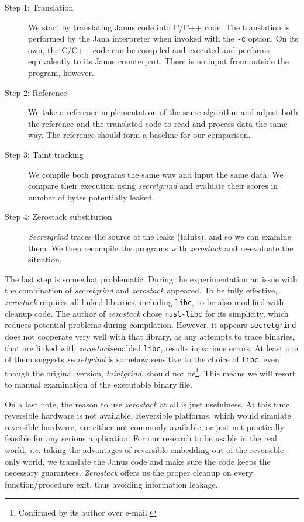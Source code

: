 \documentclass[a4paper,10pt,openright]{memoir}
\newcommand{\ie}{\emph{i.e.}\xspace}
\newcommand{\term}[1]{\textit{#1}}
\newcommand{\code}[1]{\texttt{#1}}
\begin{document}
\begin{description}

\item[Step 1: Translation] We start by translating Janus code into 
C/C++ code. The translation is performed by the Jana interpreter when 
invoked with the \code{-c} option. On its own, the C/C++ code can be 
compiled and executed and performs equivalently to its Janus 
counterpart. There is no input from outside the program, however.

\item[Step 2: Reference] We take a reference implementation of the same 
algorithm and adjust both the reference and the translated code to read 
and process data the same way. The reference should form a baseline for 
our comparison.

\item[Step 3: Taint tracking] We compile both programs the same way and 
input the same data. We compare their execution using 
\term{secretgrind} and evaluate their scores in number of bytes 
potentially leaked.

\item[Step 4: Zerostack substitution] \term{Secretgrind} traces the 
source of the leaks (taints), and so we can examine them. We then 
recompile the programs with \term{zerostack} and re-evaluate the 
situation.

\end{description}

The last step is somewhat problematic. During the experimentation an 
issue with the combination of \term{secretgrind} and \term{zerostack} 
appeared. To be fully effective, \term{zerostack} requires all linked 
libraries, including \code{libc}, to be also modified with cleanup 
code. The author of \term{zerostack} chose \code{musl-libc} for its 
simplicity, which reduces potential problems during compilation. 
However, it appears \code{secretgrind} does not cooperate very well 
with that library, as any attempts to trace binaries, that are linked 
with \term{zerostack}-enabled \code{libc}, results in various errors. 
At least one of them suggests \term{secretgrind} is somehow sensitive 
to the choice of \code{libc}, even though the original version, 
\term{taintgrind}, should not be\footnote{Confirmed by its author over 
e-mail.}. This means we will resort to manual examination of the 
executable binary file.

On a last note, the reason to use \term{zerostack} at all is just 
usefulness. At this time, reversible hardware is not available. 
Reversible platforms, which would simulate reversible hardware, are 
either not commonly available, or just not practically feasible for any 
serious application. For our research to be usable in the real world, 
\ie taking the advantages of reversible embedding out of the 
reversible-only world, we translate the Janus code and make sure the 
code keeps the necessary guarantees. \term{Zerostack} offers us the 
proper cleanup on every function/procedure exit, thus avoiding 
information leakage.
\end{document}
